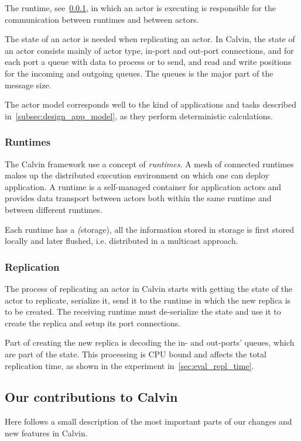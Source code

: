 \documentclass{cslthse-msc}
\begin{document}
The runtime, see~\cref{sec:calvin_runtime}, in which an actor is executing is responsible for the communication between runtimes and between actors.

The state of an actor is needed when replicating an actor. In Calvin, the state of an actor consists mainly of actor type, in-port and out-port connections, and for each port a queue with data to process or to send, and read and write positions for the incoming and outgoing queues. The queues is the major part of the message size.

The actor model corresponds well to the kind of applications and tasks described in~\cref{subsec:design_app_model}, as they perform deterministic calculations.

\subsubsection{Runtimes} \label{sec:calvin_runtime}
The Calvin framework use a concept of \emph{runtimes}. A mesh of connected runtimes makes up the distributed execution environment on which one can deploy application. A runtime is a self-managed container for application actors and provides data transport between actors both within the same runtime and between different runtimes.

Each runtime has a \emph(storage), all the information stored in storage is first stored locally and later flushed, i.e. distributed in a multicast approach.

\subsubsection{Replication} \label{subsec:calvin_replication}
The process of replicating an actor in Calvin starts with getting the state of the actor to replicate, serialize it, send it to the runtime in which the new replica is to be created. The receiving runtime must de-serialize the state and use it to create the replica and setup its port connections.

Part of creating the new replica is decoding the in- and out-ports' queues, which are part of the state. This processing is CPU bound and affects the total replication time, as shown in the experiment in~\cref{sec:eval_repl_time}.

\subsection{Our contributions to Calvin} \label{subsec:design_contributions} %
Here follows a small description of the most important parts of our changes and new features in Calvin.
\end{document}
